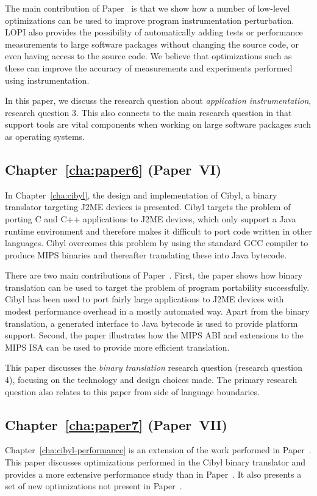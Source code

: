 The main contribution of Paper~ is that we show how a number
of low-level optimizations can be used to improve program instrumentation
perturbation. LOPI also provides the possibility of automatically adding tests
or performance measurements to large software packages without changing the
source code, or even having access to the source code. We believe that
optimizations such as these can improve the accuracy of measurements and
experiments performed using instrumentation.

In this paper, we discuss the research question about \emph{application
  instrumentation}, research question 3. This also connects to the main
research question in that support tools are vital components when working on
large software packages such as operating systems.

\subsection{Chapter~\ref{cha:paper6} (Paper~VI)}
In Chapter~\ref{cha:cibyl}, the design and implementation of Cibyl, a binary
translator targeting J2ME devices is presented. Cibyl targets the problem of
porting C and C++ applications to J2ME devices, which only support a Java
runtime environment and therefore makes it difficult to port code written in
other languages. Cibyl overcomes this problem by using the standard GCC
compiler to produce MIPS binaries and thereafter translating these into Java
bytecode.

There are two main contributions of Paper~. First, the paper
shows how binary translation can be used to target the problem of program
portability successfully. Cibyl has been used to port fairly large
applications to J2ME devices with modest performance overhead in a mostly
automated way. Apart from the binary translation, a generated interface to
Java bytecode is used to provide platform support. Second, the paper
illustrates how the MIPS ABI and extensions to the MIPS ISA can be used to
provide more efficient translation.

This paper discusses the \emph{binary translation} research question (research
question 4), focusing on the technology and design choices made. The primary
research question also relates to this paper from side of language boundaries.

\subsection{Chapter~\ref{cha:paper7} (Paper~VII)}
Chapter~\ref{cha:cibyl-performance} is an extension of the work performed in
Paper~. This paper discusses optimizations performed in the
Cibyl binary translator and provides a more extensive performance study than
in Paper~. It also presents a set of new optimizations not
present in Paper~.

